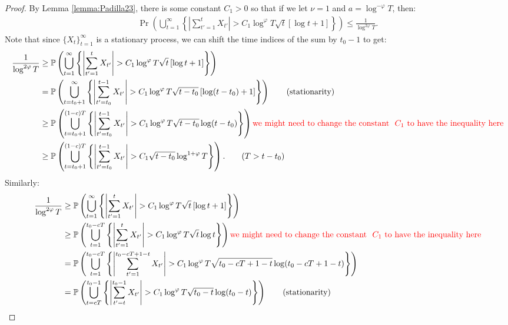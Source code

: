 \begin{proof}
By Lemma \ref{lemma:Padilla23}, there is some constant $C_1 > 0$ so that if we let $\nu = 1$ and $a = \log^{-\varphi} T$, then:
\begin{align*}
    \Pr \left(\bigcup_{t=1}^\infty\left\{\left|\sum_{t'=1}^t X_{t'}\right| > C_1\log^{\varphi}T\sqrt{t}\left[\log t + 1\right]\right\}\right) 
    \leq \frac{1}{\log^{2\varphi} T}.
\end{align*}
Note that since $\{X_t\}_{t=1}^\infty$ is a stationary process, we can shift the time indices of the sum by $t_0-1$ to get:
\scriptsize
\begin{align*}
    \frac{1}{\log^{2\varphi} T} &\geq \Pr \left(\bigcup_{t=1}^\infty\left\{\left|\sum_{t'=1}^t X_{t'}\right| > C_1\log^{\varphi}T\sqrt{t}\left[\log t + 1\right]\right\}\right) \\
    &= \Pr \left(\bigcup_{t=t_0+1}^\infty\left\{\left|\sum_{t'=t_0}^{t-1} X_{t'}\right| > C_1\log^{\varphi}T\sqrt{t-t_0}\left[\log (t-t_0) + 1\right]\right\}\right) \tag{stationarity} \\
    &\geq \Pr \left(\bigcup_{t=t_0+1}^{(1-c)T}\left\{\left|\sum_{t'=t_0}^{t-1} X_{t'}\right| > C_1\log^{\varphi}T\sqrt{t-t_0}\log (t-t_0)\right\}\right) \textcolor{red}{\text{we might need to change the constant } \,\,C_1 \,\,\text{to have the inequality here} } \\
    &\geq \Pr \left(\bigcup_{t=t_0+1}^{(1-c)T}\left\{\left|\sum_{t'=t_0}^{t-1} X_{t'}\right| > C_1\sqrt{t-t_0}\log^{1+\varphi}T\right\}\right). \tag{$T > t-t_0$}
\end{align*}
\normalsize
Similarly:
\scriptsize
\begin{align*}
     \frac{1}{\log^{2\varphi} T} &\geq \Pr \left(\bigcup_{t=1}^\infty\left\{\left|\sum_{t'=1}^t X_{t'}\right| > C_1\log^{\varphi}T\sqrt{t} \left[\log t + 1\right]\right\}\right) \\
     &\geq \Pr \left(\bigcup_{t=1}^{t_0-cT}\left\{\left|\sum_{t'=1}^t X_{t'}\right| > C_1\log^{\varphi}T\sqrt{t}\log t\right\}\right)  \textcolor{red}{\text{we might need to change the constant } \,\,C_1 \,\,\text{to have the inequality here} }\\
    &= \Pr \left(\bigcup_{t=1}^{t_0-cT}\left\{\left|\sum_{t'=1}^{t_0-cT + 1 - t} X_{t'}\right| > C_1\log^{\varphi}T\sqrt{t_0-cT + 1 - t}\log (t_0-cT + 1 - t)\right\}\right)  \\
    &= \Pr \left(\bigcup_{t=cT}^{t_0-1}\left\{\left|\sum_{t'=t}^{t_0-1} X_{t'}\right| > C_1\log^{\varphi}T\sqrt{t_0 - t}\log (t_0 - t)\right\}\right) \tag{stationarity} \\

\end{align*}
\end{proof}
